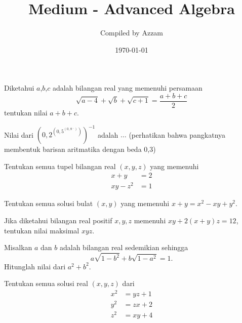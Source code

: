 \documentclass[11pt]{scrartcl}
\begin{document}
	\title{Medium - Advanced Algebra} %
	\date{\today}
	\author{Compiled by Azzam}
	\maketitle
	
	\begin{soalbaru}
	Diketahui $a$,$b$,$c$ adalah bilangan real yang memenuhi persamaan
	$$\sqrt{a-4}+\sqrt{b}+\sqrt{c+1}=\dfrac{a+b+c}{2}$$
	tentukan nilai $a+b+c$.
	\end{soalbaru}
	
	\begin{soalbaru}
	Nilai dari $\left(0,2 ^{\left(0,5 ^{\left(0,8 ^{...} \right)} \right)} \right)^{-1}$ adalah $\dots$ (perhatikan bahwa pangkatnya membentuk barisan aritmatika dengan beda 0,3)
	\end{soalbaru}
	
	\begin{soalbaru}
	Tentukan semua tupel bilangan real $(x,y,z)$ yang memenuhi
	\begin{align*}
	  x+y &= 2 \\
	xy-z^2 &= 1  
	\end{align*}
	\end{soalbaru}
	
	\begin{soalbaru}
	Tentukan semua solusi bulat $(x,y)$ yang memenuhi 
	$x+y=x^2-xy+y^2.$
	\end{soalbaru}
	
    \begin{soalbaru}
    Jika diketahui bilangan real positif $x,y,z$ memenuhi $xy+2(x+y)z=12$, tentukan nilai maksimal $xyz.$
    \end{soalbaru}
    
    \begin{soalbaru}
    Misalkan $a$ dan $b$ adalah bilangan real sedemikian sehingga $$a\sqrt{1-b^2}+b\sqrt{1-a^2}=1.$$
    Hitunglah nilai dari $a^2+b^2$.
    \end{soalbaru}
    
    \begin{soalbaru}
    Tentukan semua solusi real $(x,y,z)$ dari
    \begin{align*}
        x^2 &= yz+1\\
        y^2 &= zx+2\\
        z^2 &= xy+4
    \end{align*}
    \end{soalbaru}
    
\end{document}
